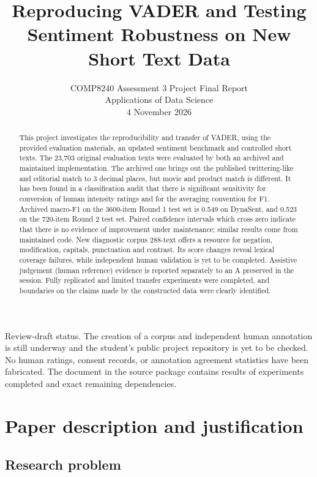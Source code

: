 \documentclass[11pt]{article}
\title{Reproducing VADER and Testing Sentiment Robustness on New Short Text Data}
\author{COMP8240 Assessment 3 Project Final Report\\Applications of Data Science\\4 November 2026}
\date{}
\begin{document}
\maketitle
\pagestyle{plain}
\thispagestyle{plain}
\begin{abstract}

This project investigates the reproducibility and transfer of VADER, using the provided evaluation materials, an updated sentiment benchmark and controlled short texts. The 23,703 original evaluation texts were evaluated by both an archived and maintained implementation. The archived one brings out the published twittering-like and editorial match to 3 decimal places, but movie and product match is different. It has been found in a classification audit that there is significant sensitivity for conversion of human intensity ratings and for the averaging convention for F1. Archived macro-F1 on the 3600-item Round 1 test set is 0.549 on DynaSent, and 0.523 on the 720-item Round 2 test set. Paired confidence intervals which cross zero indicate that there is no evidence of improvement under maintenance; similar results come from maintained code. New diagnostic corpus 288-text offers a resource for negation, modification, capitals, punctuation and contrast. Its score changes reveal lexical coverage failures, while independent human validation is yet to be completed. Assistive judgement (human reference) evidence is reported separately to an A preserved in the session. Fully replicated and limited transfer experiments were completed, and boundaries on the claims made by the constructed data were clearly identified.

\end{abstract}

Review-draft status. The creation of a corpus and independent human annotation is still underway and the student's public project repository is yet to be checked. No human ratings, consent records, or annotation agreement statistics have been fabricated. The document in the source package contains results of experiments completed and exact remaining dependencies.


\section{Paper description and justification}

\subsection{Research problem}
\end{document}
